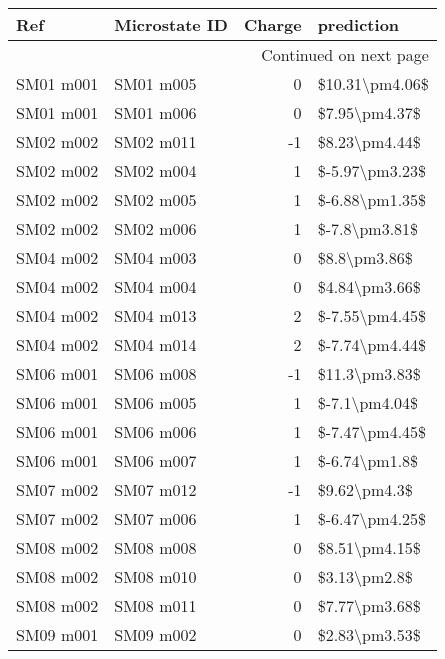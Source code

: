 \begin{longtable}{llrl}
\toprule
       Ref & Microstate ID &  Charge &      prediction \\
\midrule
\endhead
\midrule
\multicolumn{4}{r}{{Continued on next page}} \\
\midrule
\endfoot

\bottomrule
\endlastfoot
 SM01 m001 &     SM01 m005 &       0 &  \$10.31\textbackslash pm4.06\$ \\
 SM01 m001 &     SM01 m006 &       0 &   \$7.95\textbackslash pm4.37\$ \\
 SM02 m002 &     SM02 m011 &      -1 &   \$8.23\textbackslash pm4.44\$ \\
 SM02 m002 &     SM02 m004 &       1 &  \$-5.97\textbackslash pm3.23\$ \\
 SM02 m002 &     SM02 m005 &       1 &  \$-6.88\textbackslash pm1.35\$ \\
 SM02 m002 &     SM02 m006 &       1 &   \$-7.8\textbackslash pm3.81\$ \\
 SM04 m002 &     SM04 m003 &       0 &    \$8.8\textbackslash pm3.86\$ \\
 SM04 m002 &     SM04 m004 &       0 &   \$4.84\textbackslash pm3.66\$ \\
 SM04 m002 &     SM04 m013 &       2 &  \$-7.55\textbackslash pm4.45\$ \\
 SM04 m002 &     SM04 m014 &       2 &  \$-7.74\textbackslash pm4.44\$ \\
 SM06 m001 &     SM06 m008 &      -1 &   \$11.3\textbackslash pm3.83\$ \\
 SM06 m001 &     SM06 m005 &       1 &   \$-7.1\textbackslash pm4.04\$ \\
 SM06 m001 &     SM06 m006 &       1 &  \$-7.47\textbackslash pm4.45\$ \\
 SM06 m001 &     SM06 m007 &       1 &   \$-6.74\textbackslash pm1.8\$ \\
 SM07 m002 &     SM07 m012 &      -1 &    \$9.62\textbackslash pm4.3\$ \\
 SM07 m002 &     SM07 m006 &       1 &  \$-6.47\textbackslash pm4.25\$ \\
 SM08 m002 &     SM08 m008 &       0 &   \$8.51\textbackslash pm4.15\$ \\
 SM08 m002 &     SM08 m010 &       0 &    \$3.13\textbackslash pm2.8\$ \\
 SM08 m002 &     SM08 m011 &       0 &   \$7.77\textbackslash pm3.68\$ \\
 SM09 m001 &     SM09 m002 &       0 &   \$2.83\textbackslash pm3.53\$ \\

\end{longtable}
